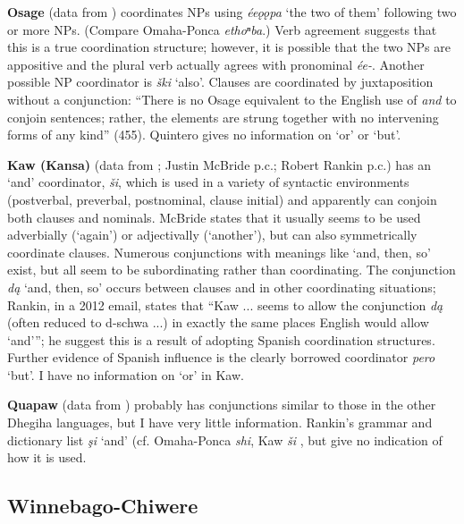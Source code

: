\documentclass[output=paper]{LSP/langsci}
\begin{document}
\textbf{Osage} (data from \citealt{Quintero2004}) coordinates NPs using \textit{ée\k{o}\k{o}pa} `the two of them' following two or more NPs. (Compare Omaha-Ponca \textit{ethoⁿba}.) Verb agreement suggests that this is a true coordination structure; however, it is possible that the two NPs are appositive and the plural verb actually agrees with pronominal \textit{ée-}. Another possible NP coordinator is \textit{\v{s}ki} `also'. Clauses are coordinated by juxtaposition without a conjunction: ``There is no Osage equivalent to the English use of \textit{and} to conjoin sentences; rather, the elements are strung together with no intervening forms of any kind'' (455). Quintero gives no information on `or' or `but'.

\textbf{Kaw (Kansa)} (data from   \citealt{CumberlandRankin2012}; Justin McBride p.c.; Robert Rankin p.c.) has an `and' coordinator, \textit{\v{s}i}, which is used in a variety of syntactic environments (postverbal, preverbal, postnominal, clause initial) and apparently can conjoin both clauses and nominals. McBride states that it usually seems to be used adverbially (`again') or adjectivally (`another'), but can also symmetrically coordinate clauses. Numerous conjunctions with meanings like `and, then, so' exist, but all seem to be subordinating rather than coordinating. The conjunction \textit{d\k{a}} `and, then, so' occurs between clauses and in other coordinating situations; Rankin, in a 2012 email, states that ``Kaw ... seems to allow the conjunction \textit{d\k{a}} (often reduced to d-schwa ...) in exactly the same places English would allow `and'''; he suggest this is a result of adopting Spanish coordination structures. Further evidence of Spanish influence is the clearly borrowed coordinator \textit{pero} `but'. I have no information on `or' in Kaw.

\textbf{Quapaw} (data from \citealt{Rankin2002,Rankin2005b}) probably has conjunctions similar to those in the other Dhegiha languages, but I have very little information. Rankin's grammar and dictionary list \textit{\c{s}i} `and' (cf. Omaha-Ponca \textit{shi}, Kaw \textit{\v{s}i} , but give no indication of how it is used.

\subsection{Winnebago-Chiwere}
 
\end{document}
